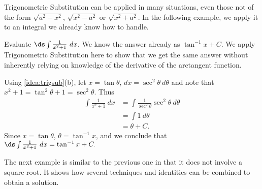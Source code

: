 Trigonometric Substitution can be applied in many situations, even those not of the form $\sqrt{a^2-x^2}$, $\sqrt{x^2-a^2}$ or $\sqrt{x^2+a^2}$. In the following example, we apply it to an integral we already know how to handle.

\begin{example}\label{ex_trigsub5}
Evaluate $\ds \int\frac1{x^2+1}\ dx$.
\solution
We know the answer already as $\tan^{-1}x+C$. We apply Trig\-o\-no\-metric Substitution here to show that we get the same answer without inherently relying on knowledge of the derivative of the arctangent function.

Using \autoref{idea:trigsub}(b), let $x=\tan\theta$, $dx=\sec^2\theta\ d\theta$ and note that $x^2+1 = \tan^2\theta+1 = \sec^2\theta$. Thus
\begin{align*}
\int \frac1{x^2+1}\ dx &= \int \frac{1}{\sec^2\theta}\sec^2\theta\ d\theta \\
			&= \int 1\ d\theta\\
			&= \theta + C.
\end{align*}
Since $x=\tan \theta$, $\theta = \tan^{-1}x$, and we conclude that $\ds \int\frac1{x^2+1}\ dx = \tan^{-1}x+C.$
\end{example}

The next example is similar to the previous one in that it does not involve a square-root. It shows how several techniques and identities can be combined to obtain a solution.


